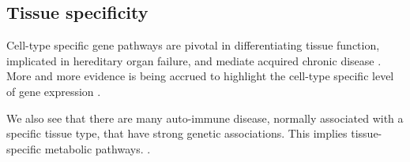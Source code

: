 \documentclass[11pt]{article} %
\begin{document}
%	
%	
	
	\subsection{Tissue specificity} \label{sec:tissue_specificity}
	Cell-type specific gene pathways are pivotal in differentiating tissue function, implicated in hereditary organ failure, and mediate acquired chronic disease \cite{ju_defining_2013}. More and more evidence is being accrued to highlight the cell-type specific level of gene expression \cite{grundberg_mapping_2012}\cite{ong_enhancer_2011}\cite{maniatis_regulation_1987}. 
	
	
	We also see that there are many auto-immune disease, normally associated with a specific tissue type, that have strong genetic associations. This implies tissue-specific metabolic pathways.  \cite{vyse_genetic_1996}\cite{maas_cutting_2002}\cite{aune_co-localization_2004}\cite{botstein_discovering_2003}.
	
\end{document}
